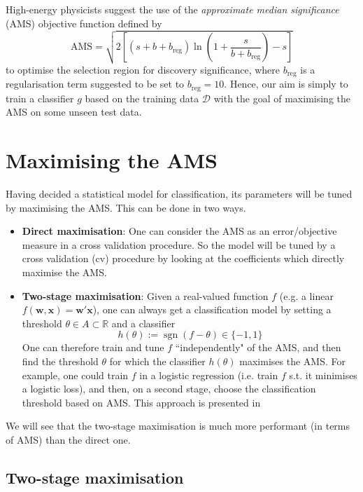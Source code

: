 \documentclass[]{article}
\begin{document}
High-energy physicists suggest the use of the \textit{approximate median significance} (AMS) objective function defined by
\begin{equation}
\label{AMS}
	\text{AMS} = \sqrt{2 \left[ (s + b + b_\text{reg}) \ln \left( 1 + \frac{s}{b + b_\text{reg}} \right) - s \right]}
\end{equation}
to optimise the selection region for discovery significance, where $b_\text{reg}$ is a regularisation term suggested to be set to $b_\text{reg}=10$. Hence, our aim is simply to train a classifier $g$ based on the training data $\mathcal{D}$ with the goal of maximising the AMS on some unseen test data.

\section{Maximising the AMS}

Having decided a statistical model for classification, its parameters will be tuned by maximising the AMS. This can be done in two ways.

\begin{itemize}
\item \textbf{Direct maximisation}: One can consider the AMS as an error/objective measure in a cross validation procedure. So the model will be tuned by a cross validation (cv) procedure by looking at the coefficients which directly maximise the AMS.

\item \textbf{Two-stage maximisation}: Given a real-valued function $f$ (e.g. a linear $f(\bm{w},\bm{x})=\bm{w}'\bm{x}$), one can always get a classification model by setting a threshold $\theta \in A\subset \mathbb{R}$ and a classifier
\begin{equation}
\label{classifier from f}
h(\theta):=\operatorname{sgn}(f-\theta)\in \{-1,1\}
\end{equation}
One can therefore train and tune $f$ ``independently" of the AMS, and then find the threshold $\theta$ for which the classifier $h(\theta)$ maximises the AMS. For example, one could train $f$ in a logistic regression (i.e. train $f$ s.t. it minimises a logistic loss), and then, on a second stage, choose the classification threshold based on AMS. This approach is presented in \cite{kotlowski2014consistent}
\end{itemize}
We will see that the two-stage maximisation is much more performant (in terms of AMS) than the direct one.

\subsection{Two-stage maximisation}
\end{document}

